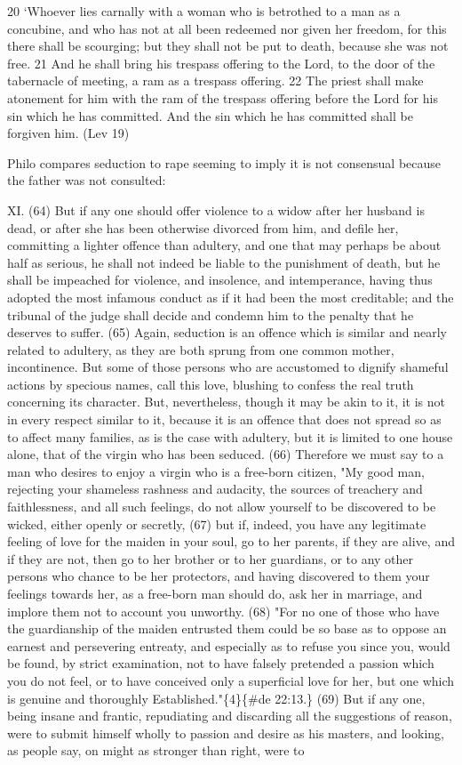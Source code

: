 \documentclass[11pt]{article}
\begin{document}
20 ‘Whoever lies carnally with a woman who is betrothed to a man as a concubine, and who has not at all been redeemed nor given her freedom, for this there shall be scourging; but they shall not be put to death, because she was not free. 21 And he shall bring his trespass offering to the Lord, to the door of the tabernacle of meeting, a ram as a trespass offering. 22 The priest shall make atonement for him with the ram of the trespass offering before the Lord for his sin which he has committed. And the sin which he has committed shall be forgiven him. (Lev 19)

Philo compares seduction to rape seeming to imply it is not consensual because the father was not consulted:

XI. (64) But if any one should offer violence to a widow after her husband is dead, or after she has been otherwise divorced from him, and defile her, committing a lighter offence than adultery, and one that may perhaps be about half as serious, he shall not indeed be liable to the punishment of death, but he shall be impeached for violence, and insolence, and intemperance, having thus adopted the most infamous conduct as if it had been the most creditable; and the tribunal of the judge shall decide and condemn him to the penalty that he deserves to suffer. (65) Again, seduction is an offence which is similar and nearly related to adultery, as they are both sprung from one common mother, incontinence. But some of those persons who are accustomed to dignify shameful actions by specious names, call this love, blushing to confess the real truth concerning its character. But, nevertheless, though it may be akin to it, it is not in every respect similar to it, because it is an offence that does not spread so as to affect many families, as is the case with adultery, but it is limited to one house alone, that of the virgin who has been seduced. (66) Therefore we must say to a man who desires to enjoy a virgin who is a free-born citizen, "My good man, rejecting your shameless rashness and audacity, the sources of treachery and faithlessness, and all such feelings, do not allow yourself to be discovered to be wicked, either openly or secretly, (67) but if, indeed, you have any legitimate feeling of love for the maiden in your soul, go to her parents, if they are alive, and if they are not, then go to her brother or to her guardians, or to any other persons who chance to be her protectors, and having discovered to them your feelings towards her, as a free-born man should do, ask her in marriage, and implore them not to account you unworthy. (68) "For no one of those who have the guardianship of the maiden entrusted them could be so base as to oppose an earnest and persevering entreaty, and especially as to refuse you since you, would be found, by strict examination, not to have falsely pretended a passion which you do not feel, or to have conceived only a superficial love for her, but one which is genuine and thoroughly Established."\{4\}\{\#de 22:13.\} (69) But if any one, being insane and frantic, repudiating and discarding all the suggestions of reason, were to submit himself wholly to passion and desire as his masters, and looking, as people say, on might as stronger than right, were to 
\end{document}
